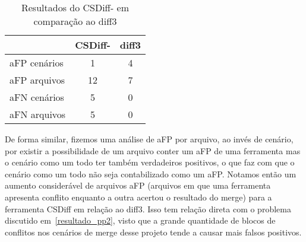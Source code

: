 \begin{table}[ht]
	\begin{center}
		\begin{tabular}{|l|c|c|}
			\hline
			\textbf{ }   & \textbf{CSDiff-} & \textbf{diff3} \\
			\hline
			aFP cenários & 1                & 4              \\
			aFP arquivos & 12               & 7              \\
			aFN cenários & 5                & 0              \\
			aFN arquivos & 5                & 0              \\
			\hline
		\end{tabular}
	\end{center}
	\caption{Resultados do CSDiff- em comparação ao diff3}\label{csdiff_minus_afp_afn}
\end{table}

De forma similar, fizemos uma análise de aFP por arquivo, ao
invés de cenário, por existir a possibilidade de um arquivo conter
um aFP de uma ferramenta mas o cenário como um todo ter também verdadeiros positivos, o que faz com que o cenário como um
todo não seja contabilizado como um aFP. Notamos então um aumento considerável de
arquivos aFP (arquivos em que uma ferramenta apresenta conflito enquanto a outra
acertou o resultado do merge) para a ferramenta CSDiff em relação ao diff3. Isso tem relação direta com o
problema discutido em~\ref{resultado_pp2}, visto que a
grande quantidade de blocos de conflitos nos cenários de merge desse projeto
tende a causar mais falsos positivos.

